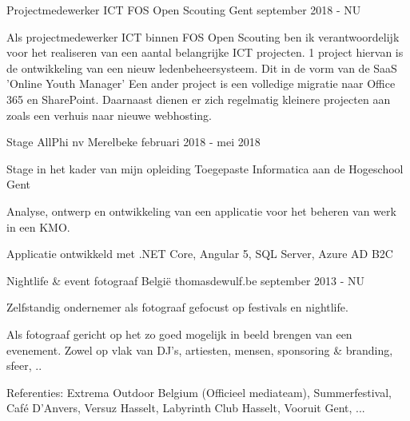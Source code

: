 


\begin{cventries}

\cventry
{Projectmedewerker ICT} %
{FOS Open Scouting} %
{Gent} %
{september 2018 - NU} %
{ %
\begin{cvitems}
\item {Als projectmedewerker ICT binnen FOS Open Scouting ben ik verantwoordelijk voor het realiseren van een aantal belangrijke ICT projecten.
1 project hiervan is de ontwikkeling van een nieuw ledenbeheersysteem. Dit in de vorm van de SaaS 'Online Youth Manager' Een ander project is een volledige migratie naar Office 365 en SharePoint.
Daarnaast dienen er zich regelmatig kleinere projecten aan zoals een verhuis naar nieuwe webhosting.}
\end{cvitems}
}


\cventry
{Stage} %
{AllPhi nv} %
{Merelbeke} %
{februari 2018 - mei 2018} %
{ %
\begin{cvitems}
\item {Stage in het kader van mijn opleiding Toegepaste Informatica aan de Hogeschool Gent }
\item {Analyse, ontwerp en ontwikkeling van een applicatie voor het beheren van werk in een KMO.}
\item {Applicatie ontwikkeld met .NET Core, Angular 5, SQL Server, Azure AD B2C}
\end{cvitems}
}

\cventry
{Nightlife \& event fotograaf} %
{België} %
{thomasdewulf.be} %
{september 2013 - NU} %
{ %
\begin{cvitems}
\item {Zelfstandig ondernemer als fotograaf gefocust op festivals en nightlife. }
\item {Als fotograaf gericht op het zo goed mogelijk in beeld brengen van een evenement. Zowel op vlak van DJ's, artiesten, mensen, sponsoring \& branding, sfeer, ..}
\item {Referenties: Extrema Outdoor Belgium (Officieel mediateam), Summerfestival, Café D'Anvers, Versuz Hasselt, Labyrinth Club Hasselt, Vooruit Gent, ...}
\end{cvitems}
}


\end{cventries}
